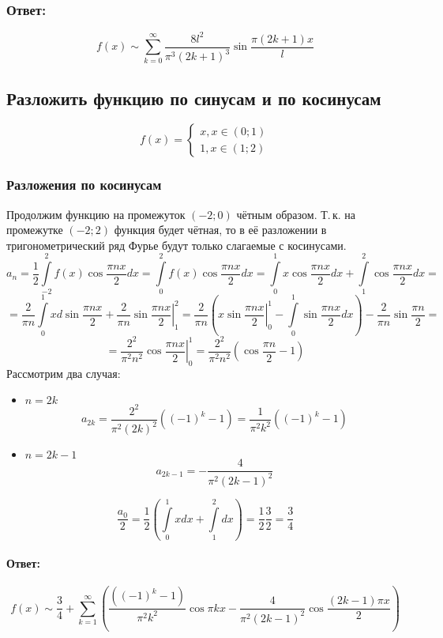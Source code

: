 \documentclass[12pt]{scrartcl}
\begin{document}
\subsubsection*{Ответ:}
$$f\left(x\right) \sim \sum\limits_{k = 0}^\infty \frac{8l^2}{\pi^3 \left(2k+1\right)^3} \sin\frac{\pi \left(2k +1\right) x}{l}$$
\newpage
\subsection{Разложить функцию по синусам и по косинусам}
$$f\left(x\right) = \begin{cases}
x, x\in\left(0;1\right)\\
1, x\in\left(1;2\right)
\end{cases}
$$
\subsubsection{Разложения по косинусам}
Продолжим функцию на промежуток $\left(-2;0\right)$ чётным образом.
Т.\,к. на промежутке $\left(-2;2\right)$ функция будет чётная, то в её разложении в тригонометрический ряд Фурье будут только слагаемые с косинусами.
$$a_n
=
\frac{1}{2} \int\limits_{-2}^2 f\left(x\right) \cos\frac{\pi n x}{2} dx =
\int\limits_0^2 f\left(x\right) \cos\frac{\pi n x}{2} dx
=
\int\limits_0^1 x\cos\frac{\pi n x}{2} dx + \int\limits_1^2 \cos\frac{\pi n x}{2} dx = $$
$$=\frac{2}{\pi n}\int\limits_0^1 x d\sin\frac{\pi n x}{2} + \frac{2}{\pi n}\left.\sin\frac{\pi n x}{2}\right|_1^2 = 
\frac{2}{\pi n}\left(\left.x\sin\frac{\pi n x}{2}\right|_0^1 - \int\limits_0^1\sin\frac{\pi n x}{2} dx\right) - \frac{2}{\pi n}\sin\frac{\pi n}{2}
=
$$
$$ =
\frac{2^2}{\pi^2 n^2}\left.\cos\frac{\pi n x}{2}\right|_0^1 =
\frac{2^2}{\pi^2 n^2}\left(\cos\frac{\pi n}{2} - 1\right)
$$
Рассмотрим два случая:
\begin{itemize}
\item $n = 2k$
$$a_{2k} = \frac{2^2}{\pi^2 \left(2 k\right)^2}\left(\left(-1\right)^k - 1\right) = 
\frac{1}{\pi^2 k^2}\left(\left(-1\right)^k - 1\right)$$
\item $n = 2k - 1$
$$a_{2k-1} = -\frac{4}{\pi^2 \left(2 k - 1\right)^2}$$
\end{itemize}
$$\frac{a_0}{2} = \frac12\left(\int\limits_0^1x dx + \int\limits_1^2 dx\right) = \frac12 \frac32 = \frac34$$
\paragraph*{Ответ:}
$$f\left(x\right) \sim \frac34 + \sum\limits_{k=1}^\infty{\left(\frac{\left(\left(-1\right)^k - 1\right)}{\pi^2 k^2} \cos{\pi k x} -\frac{4}{\pi^2 \left(2k - 1\right)^2}\cos\frac{\left(2k - 1\right) \pi x}{2}\right)}$$
\end{document}
